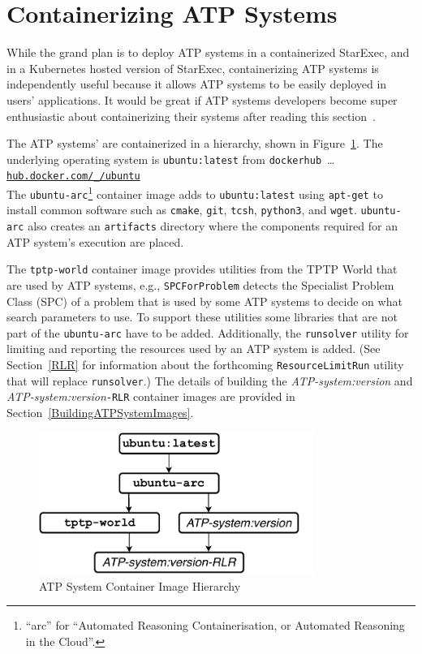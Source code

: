 \documentclass{easychair}
\begin{document}
\section{Containerizing ATP Systems}
\label{ContainerizingATPSystems}

While the grand plan is to deploy ATP systems in a containerized StarExec, and in a Kubernetes 
hosted version of StarExec, containerizing ATP systems is independently useful because it allows 
ATP systems to be easily deployed in users' applications.
It would be great if ATP systems developers become super enthusiastic about containerizing their 
systems after reading this section~\smiley.

The ATP systems' are containerized in a hierarchy, shown in Figure~\ref{ImageDAG}.
The underlying operating system is {\tt ubuntu:latest} from {\tt dockerhub}~\ldots\\
\hspace*{1cm}\href{https://hub.docker.com/_/ubuntu}{\tt hub.docker.com/\_/ubuntu} \\
The {\tt ubuntu-arc}\footnote{%
``arc'' for ``Automated Reasoning Containerisation, or Automated Reasoning in the Cloud''.}
container image adds to {\tt ubuntu:latest} using {\tt apt-get} to 
install common software such as {\tt cmake}, {\tt git}, {\tt tcsh}, {\tt python3}, and {\tt wget}.
{\tt ubuntu-arc} also creates an {\tt artifacts} directory where the components required for 
an ATP system's execution are placed.

The {\tt tptp-world} container image provides utilities from the TPTP World that are used by 
ATP systems, e.g., {\tt SPCForProblem} detects the Specialist Problem Class (SPC) \cite{SS01} of 
a problem that is used by some ATP systems to decide on what search parameters to use.
To support these utilities some libraries that are not part of the {\tt ubuntu-arc} have
to be added.
Additionally, the {\tt runsolver} utility for limiting and reporting the resources used by an 
ATP system is added.
(See Section~\ref{RLR} for information about the forthcoming {\tt ResourceLimitRun} utility
that will replace {\tt runsolver}.)
The details of building the {\em ATP-system:version} and {\em ATP-system:version}{\tt -RLR}
container images are provided in Section~\ref{BuildingATPSystemImages}.

\begin{figure}[htb]
\begin{center}
\includegraphics[width=0.8\textwidth]{ImageDAG} 
\caption{ATP System Container Image Hierarchy}
\label{ImageDAG}
\end{center}
\end{figure}
\end{document}
